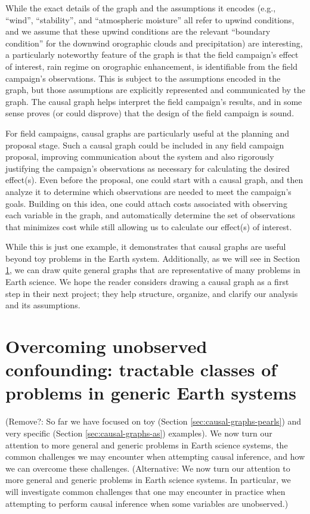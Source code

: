 \documentclass[12pt]{article}
\begin{document}
While the exact details of the graph and the assumptions it encodes
(e.g., ``wind'', ``stability'', and ``atmospheric moisture'' all refer
to upwind conditions, and we assume that these upwind conditions are
the relevant ``boundary condition'' for the downwind orographic clouds
and precipitation) are interesting, a particularly noteworthy feature
of the graph is that the field campaign's effect of interest, rain
regime on orographic enhancement, is identifiable from the field
campaign's observations. This is subject to the assumptions encoded in
the graph, but those assumptions are explicitly represented and
communicated by the graph. The causal graph helps interpret the field
campaign's results, and in some sense proves (or could disprove) that
the design of the field campaign is sound.

For field campaigns, causal graphs are particularly useful at the
planning and proposal stage. Such a causal graph could be included in
any field campaign proposal, improving communication about the system
and also rigorously justifying the campaign’s observations as
necessary for calculating the desired effect(s). Even before the
proposal, one could start with a causal graph, and then analyze it to
determine which observations are needed to meet the campaign’s
goals. Building on this idea, one could attach costs associated with
observing each variable in the graph, and automatically determine the
set of observations that minimizes cost while still allowing us to
calculate our effect(s) of interest.

While this is just one example, it demonstrates that causal graphs are
useful beyond toy problems in the Earth system. Additionally, as we
will see in Section \ref{sec:necess-cond-caus}, we can draw quite
general graphs that are representative of many problems in Earth
science. We hope the reader considers drawing a causal graph as a
first step in their next project; they help structure, organize, and
clarify our analysis and its assumptions.


\section{Overcoming unobserved confounding: tractable classes of
  problems in generic Earth systems}
\label{sec:necess-cond-caus}

(Remove?: So far we have focused on toy (Section
\ref{sec:causal-graphs-pearls}) and very specific (Section
\ref{sec:causal-graphs-as}) examples). We now turn our attention to
more general and generic problems in Earth science systems, the common
challenges we may encounter when attempting causal inference, and how
we can overcome these challenges. (Alternative: We now turn our
attention to more general and generic problems in Earth science
systems. In particular, we will investigate common challenges that one
may encounter in practice when attempting to perform causal inference
when some variables are unobserved.)
\end{document}
